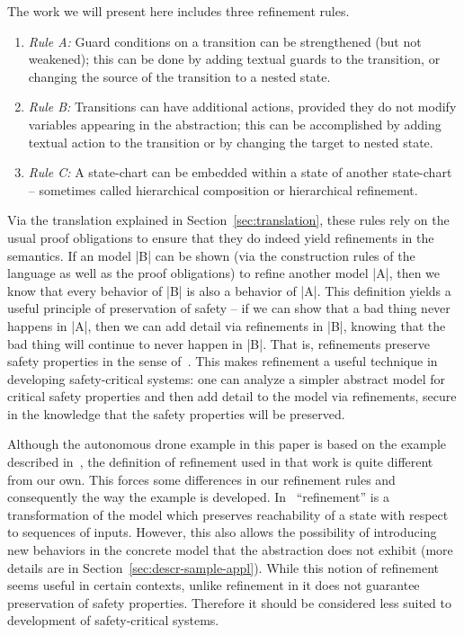 

The work we will present here includes three refinement rules.
\begin{enumerate}
\item  \emph{Rule A:} Guard conditions on a transition can be strengthened (but not weakened); 
this can be done by adding textual guards to the transition, or
changing the source of the transition to a nested state.
\item \emph{Rule B:} Transitions can have additional actions, provided they do not
  modify variables appearing in the abstraction; this can be 
  accomplished by adding textual action to the transition 
  or by changing the target to nested state.
\item \emph{Rule C:} A state-chart can be embedded within a state of another
  state-chart -- sometimes called hierarchical composition or
  hierarchical refinement.
\end{enumerate}
Via the translation explained in Section~\ref{sec:translation}, these rules
rely on the usual \EventB proof obligations to ensure that they do
indeed yield refinements in the \EventB semantics.
If an \EventB model |B| can be shown (via the construction rules of
the \EventB language as well as the proof obligations) to refine
another \EventB model |A|, then we know that every behavior of |B| is
also a behavior of |A|. This definition yields a useful principle of
preservation of safety -- if we can show that a bad thing never
happens in |A|, then we can add detail via refinements in |B|, knowing
that the bad thing will continue to never happen in |B|. That is,
\EventB refinements preserve safety properties in the sense
of~\cite{lamport1977proving}. This makes refinement a useful technique
in developing safety-critical systems: one can analyze a simpler
abstract model for critical safety properties and then add detail to
the model via refinements, secure in the knowledge that the safety
properties will be preserved.

Although the autonomous drone example in this paper is based on the
example described in~\cite{Syriani_2019}, the definition of refinement
used in that work is quite different from our own. This forces some
differences in our refinement rules and consequently the way the
example is developed.  In~\cite{Syriani_2019} ``refinement'' is a
transformation of the model which preserves reachability of a state
with respect to sequences of inputs. However, this also allows the
possibility of introducing new behaviors in the concrete model that
the abstraction does not exhibit (more details are in
Section~\ref{sec:descr-sample-appl}). While this notion of refinement
seems useful in certain contexts, unlike refinement in \EventB it does
not guarantee preservation of safety properties. Therefore it should
be considered less suited to development of safety-critical systems.

